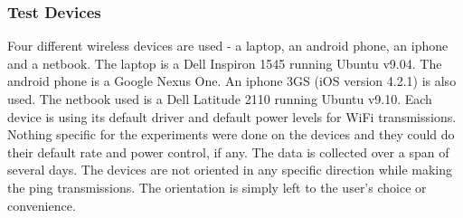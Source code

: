 \subsubsection{Test Devices}
\label{subsubsec:testdevices}

Four different wireless devices are used - a laptop, an android phone, an iphone and a netbook. The laptop is a Dell Inspiron 1545 running Ubuntu v9.04. The android phone is a Google Nexus One. An iphone 3GS (iOS version 4.2.1) is also used. The netbook used is a Dell Latitude 2110 running Ubuntu v9.10. Each device is using its default driver and default power levels for WiFi transmissions. %
{\color{red} Nothing specific for the experiments were done on the devices and they could do their default rate and power control, if any.}
The data is collected over a span of several days. The devices are not oriented
in any specific direction while making the ping transmissions. The orientation is simply left to the user's choice or convenience. 

%
